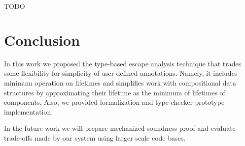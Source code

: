 \documentclass[11pt]{article}
\begin{document}

    TODO %


    \section{Conclusion}

    In this work we proposed the type-based escape analysis technique that trades some flexibility for simplicity of user-defined annotations.
    Namely, it includes minimum operation on lifetimes and simplifies work with compositional data structures by approximating their lifetime as the minimum of lifetimes of components.
    Also, we provided formalization and type-checker prototype implementation.

    In the future work we will prepare mechanized soundness proof and evaluate trade-offs made by our system using larger scale code bases.


    
    
\end{document}
